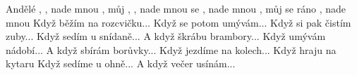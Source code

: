 \begin{TEXT}{Andělé}
\REFREN {},  ,  nade mnou , můj 
,  ,  nade mnou 
\SLOKA {} se  ,  nade mnou , můj 
 se ráno ,  nade mnou 
\SLOKA Když běžím na rozcvičku...
\SLOKA Když se potom umývám...
\SLOKA Když si pak čistím zuby...
\SLOKA Když sedím u snídaně...
\SLOKA A když škrábu brambory...
\SLOKA Když umývám nádobí...
\SLOKA A když sbírám borůvky...
\SLOKA Když jezdíme na kolech...
\SLOKA Když hraju na kytaru
\SLOKA Když sedíme u ohně...
\SLOKA A když večer usínám...
\end{TEXT}